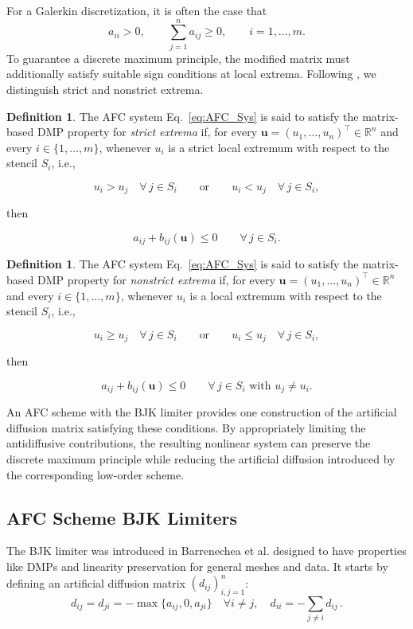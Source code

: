\documentclass[a4paper]{article}
\theoremstyle{plain}
\theoremstyle{definition}
\newtheorem{definition}[lemma]{Definition}
\theoremstyle{remark}
\begin{document}
For a Galerkin discretization, it is often the case that
\begin{equation}
a_{ii}>0,\qquad\sum_{j=1}^{n}a_{ij}\geq0, \qquad i=1,\ldots,m.
\end{equation}
To guarantee a discrete maximum principle, the modified matrix must additionally satisfy suitable sign conditions at local extrema. Following \cite[Theorem~7.2]{BJK25}, we distinguish strict and nonstrict extrema.

\begin{definition}
The AFC system Eq.~\eqref{eq:AFC_Sys} is said to satisfy the matrix-based DMP property for \emph{strict extrema} if, for every $\mathbf u=(u_1,\ldots,u_n)^\top\in\mathbb R^n$ and every $i\in\{1,\ldots,m\}$, whenever $u_i$ is a strict local extremum with respect to the stencil $S_i$, i.e.,

$$
u_i>u_j\quad\forall\,j\in S_i \qquad\text{or}\qquad u_i<u_j\quad\forall\,j\in S_i,
$$

then

$$
a_{ij}+b_{ij}(\mathbf u)\leq0 \qquad\forall\,j\in S_i.
$$

\label{def:strict}
\end{definition}

\begin{definition}
The AFC system Eq.~\eqref{eq:AFC_Sys} is said to satisfy the matrix-based DMP property for \emph{nonstrict extrema} if, for every $\mathbf u=(u_1,\ldots,u_n)^\top\in\mathbb R^n$ and every $i\in\{1,\ldots,m\}$, whenever $u_i$ is a local extremum with respect to the stencil $S_i$, i.e.,

$$
u_i\geq u_j\quad\forall\,j\in S_i \qquad\text{or}\qquad u_i\leq u_j\quad\forall\,j\in S_i,
$$

then

$$
a_{ij}+b_{ij}(\mathbf u)\leq0 \qquad\forall\,j\in S_i\text{ with }u_j\neq u_i.
$$

\label{def:nonstrict}
\end{definition}

An AFC scheme with the BJK limiter provides one construction of the artificial diffusion matrix satisfying these conditions. By appropriately limiting the antidiffusive contributions, the resulting nonlinear system can preserve the discrete maximum principle while reducing the artificial diffusion introduced by the corresponding low-order scheme.

\subsection{AFC Scheme BJK Limiters}
The BJK limiter was introduced in Barrenechea et al. \cite{BJK17} designed to have properties like DMPs and linearity preservation for general meshes and data.
It starts by defining an artificial diffusion matrix $(d_{ij})_{i,j=1}^n$:
\begin{equation*}
	d_{ij} = d_{ji} = -\max \{a_{ij}, 0, a_{ji}\} \quad \forall i \neq j, \quad d_{ii} = -\sum_{j \neq i} d_{ij} \,. 
\end{equation*}
\end{document}
